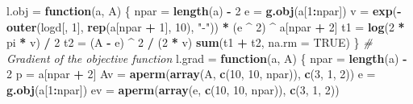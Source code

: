 \documentclass[]{article}
\newenvironment{Shaded}{\begin{snugshade}}{\end{snugshade}}
\newcommand{\CommentTok}[1]{\textcolor[rgb]{0.56,0.35,0.01}{\textit{#1}}}
\newcommand{\ControlFlowTok}[1]{\textcolor[rgb]{0.13,0.29,0.53}{\textbf{#1}}}
\newcommand{\DataTypeTok}[1]{\textcolor[rgb]{0.13,0.29,0.53}{#1}}
\newcommand{\DecValTok}[1]{\textcolor[rgb]{0.00,0.00,0.81}{#1}}
\newcommand{\KeywordTok}[1]{\textcolor[rgb]{0.13,0.29,0.53}{\textbf{#1}}}
\newcommand{\NormalTok}[1]{#1}
\newcommand{\OperatorTok}[1]{\textcolor[rgb]{0.81,0.36,0.00}{\textbf{#1}}}
\newcommand{\OtherTok}[1]{\textcolor[rgb]{0.56,0.35,0.01}{#1}}
\newcommand{\StringTok}[1]{\textcolor[rgb]{0.31,0.60,0.02}{#1}}
\begin{document}
\begin{Shaded}
\begin{Highlighting}[]
\NormalTok{l.obj =}\StringTok{ }\ControlFlowTok{function}\NormalTok{(a, A) \{}
\NormalTok{  npar =}\StringTok{ }\KeywordTok{length}\NormalTok{(a) }\OperatorTok{-}\StringTok{ }\DecValTok{2}
\NormalTok{  e =}\StringTok{ }\KeywordTok{g.obj}\NormalTok{(a[}\DecValTok{1}\OperatorTok{:}\NormalTok{npar])}
\NormalTok{  v =}\StringTok{ }\KeywordTok{exp}\NormalTok{(}\OperatorTok{-}\KeywordTok{outer}\NormalTok{(logd[, }\DecValTok{1}\NormalTok{], }\KeywordTok{rep}\NormalTok{(a[npar }\OperatorTok{+}\StringTok{ }\DecValTok{1}\NormalTok{], }\DecValTok{10}\NormalTok{), }\StringTok{"-"}\NormalTok{)) }\OperatorTok{*}\StringTok{ }\NormalTok{(e }\OperatorTok{^}\StringTok{ }\DecValTok{2}\NormalTok{) }\OperatorTok{^}\StringTok{ }\NormalTok{a[npar }\OperatorTok{+}
\StringTok{                                                                        }\DecValTok{2}\NormalTok{]}
\NormalTok{  t1 =}\StringTok{ }\KeywordTok{log}\NormalTok{(}\DecValTok{2} \OperatorTok{*}\StringTok{ }\NormalTok{pi }\OperatorTok{*}\StringTok{ }\NormalTok{v) }\OperatorTok{/}\StringTok{ }\DecValTok{2}
\NormalTok{  t2 =}\StringTok{ }\NormalTok{(A }\OperatorTok{-}\StringTok{ }\NormalTok{e) }\OperatorTok{^}\StringTok{ }\DecValTok{2} \OperatorTok{/}\StringTok{ }\NormalTok{(}\DecValTok{2} \OperatorTok{*}\StringTok{ }\NormalTok{v)}
  \KeywordTok{sum}\NormalTok{(t1 }\OperatorTok{+}\StringTok{ }\NormalTok{t2, }\DataTypeTok{na.rm =} \OtherTok{TRUE}\NormalTok{)}
\NormalTok{\}}
\CommentTok{# Gradient of the objective function}
\NormalTok{l.grad =}\StringTok{ }\ControlFlowTok{function}\NormalTok{(a, A) \{}
\NormalTok{  npar =}\StringTok{ }\KeywordTok{length}\NormalTok{(a) }\OperatorTok{-}\StringTok{ }\DecValTok{2}
\NormalTok{  p =}\StringTok{ }\NormalTok{a[npar }\OperatorTok{+}\StringTok{ }\DecValTok{2}\NormalTok{]}
\NormalTok{  Av =}\StringTok{ }\KeywordTok{aperm}\NormalTok{(}\KeywordTok{array}\NormalTok{(A, }\KeywordTok{c}\NormalTok{(}\DecValTok{10}\NormalTok{, }\DecValTok{10}\NormalTok{, npar)), }\KeywordTok{c}\NormalTok{(}\DecValTok{3}\NormalTok{, }\DecValTok{1}\NormalTok{, }\DecValTok{2}\NormalTok{))}
\NormalTok{  e =}\StringTok{ }\KeywordTok{g.obj}\NormalTok{(a[}\DecValTok{1}\OperatorTok{:}\NormalTok{npar])}
\NormalTok{  ev =}\StringTok{ }\KeywordTok{aperm}\NormalTok{(}\KeywordTok{array}\NormalTok{(e, }\KeywordTok{c}\NormalTok{(}\DecValTok{10}\NormalTok{, }\DecValTok{10}\NormalTok{, npar)), }\KeywordTok{c}\NormalTok{(}\DecValTok{3}\NormalTok{, }\DecValTok{1}\NormalTok{, }\DecValTok{2}\NormalTok{))}

\end{Highlighting}
\end{Shaded}
\end{document}
